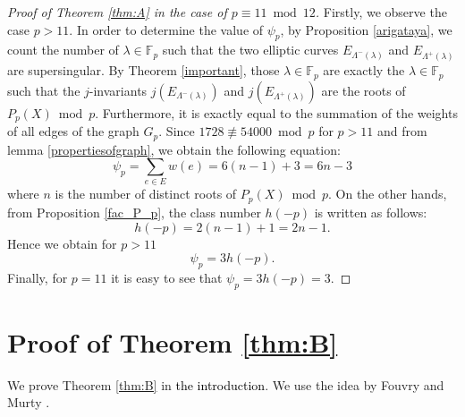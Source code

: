 \documentclass[a4paper, 11pt]{article}
\theoremstyle{plain}
\newcommand{\?}{\textcolor{red}{??}}
\newcommand{\lm}{\lambda}
\newcommand{\Lm}{\Lambda}
\newcommand{\fp}{\mathbb{F}_p}
\begin{document}
\begin{proof}[Proof of Theorem \ref{thm:A} in the case of $p \equiv11 \bmod12$] 
Firstly, we observe the case $p>11$.
    In order to determine the value of $\psi_p$, by Proposition \ref{arigataya}, we count the number of $\lm \in \fp$ such that the two elliptic curves $E_{\Lm^{-}(\lm)}$ and $E_{\Lm^{+}(\lm)}$ are supersingular. By Theorem \ref{important}, those $\lm\in \fp$ are exactly the $\lm\in \fp$ such that the $j$-invariants $j(E_{\Lm^{-}(\lm)})$ and  $j(E_{\Lm^{+}(\lm)})$ are the roots of $P_{p}(X) \bmod p$. Furthermore, it is exactly equal to the summation of the weights of all edges of the graph $G_p$. Since $1728 \not \equiv54000 \bmod p$ for $p>11$ and from lemma \ref{propertiesofgraph}, we obtain the following equation:
    \[
    \psi_p=\sum_{e\in E}w(e)=6(n-1)+3=6n-3
    \]
    where $n$ is the number of distinct roots of $P_p(X) \bmod p$.
On the other hands, from Proposition \ref{fac_P_p}, the class number $h(-p)$ is written as follows:
\[
h(-p)=2(n-1)+1=2n-1.
\]
Hence we obtain for $p>11$
\[
\psi_p=3h(-p).
\]
Finally, for $p=11$ it is easy to see that $\psi_p=3h(-p)=3$.  
\end{proof}


\section{Proof of Theorem \ref{thm:B}}
\label{pfofb}
We prove Theorem \ref{thm:B} in \textcolor{black}{the introduction}. We use the idea by Fouvry and Murty \cite[Theorem 4]{FM01}. 
\end{document}
